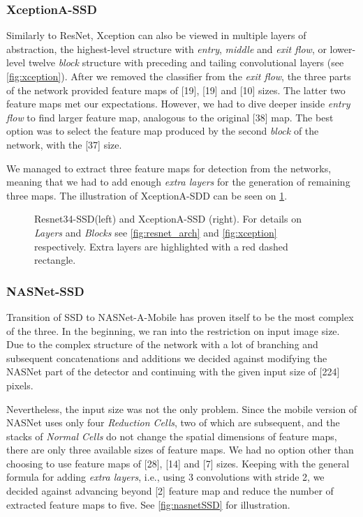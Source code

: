 \subsubsection{XceptionA-SSD} Similarly to ResNet, Xception can also be viewed in multiple layers of abstraction, the highest-level structure with \textit{entry}, \textit{middle} and \textit{exit flow}, or lower-level twelve \textit{block} structure with preceding and tailing convolutional layers (see \cref{fig:xception}). After we removed the classifier from the \textit{exit flow}, the three parts of the network provided feature maps of [19], [19] and [10] sizes. The latter two feature maps met our expectations. However, we had to dive deeper inside \textit{entry flow} to find larger feature map, analogous to the original [38] map. The best option was to select the feature map produced by the second \textit{block} of the network, with the [37] size. 

We managed to extract three feature maps for detection from the networks, meaning that we had to add enough \textit{extra layers} for the generation of remaining three maps. The illustration of XceptionA-SDD can be seen on \cref{fig:resnet_xception_SSD}.


\begin{figure}
    \centering
    \resnetSSD
    \caption[Resnet34-SSD and XceptionA-SSD]%
    {Resnet34-SSD(left) and XceptionA-SSD (right). For details on \textit{Layers} and \textit{Blocks} see \cref{fig:resnet_arch} and \cref{fig:xception} respectively. Extra layers are highlighted with a red dashed rectangle.}

    \label{fig:resnet_xception_SSD}
\end{figure}

\subsubsection{NASNet-SSD} Transition of SSD to NASNet-A-Mobile has proven itself to be the most complex of the three. In the beginning, we ran into the restriction on input image size. Due to the complex structure of the network with a lot of branching and subsequent concatenations and additions we decided against modifying the NASNet part of the detector and continuing with the given input size of [224] pixels.

Nevertheless, the input size was not the only problem. Since the mobile version of NASNet uses only four \textit{Reduction Cells}, two of which are subsequent, and the stacks of \textit{Normal Cells} do not change the spatial dimensions of feature maps, there are only three available sizes of feature maps. We had no option other than choosing to use feature maps of [28], [14] and [7] sizes. Keeping with the general formula for adding \textit{extra layers}, i.e., using 3 convolutions with stride 2, we decided against advancing beyond [2] feature map and reduce the number of extracted feature maps to five. See \cref{fig:nasnetSSD} for illustration.


